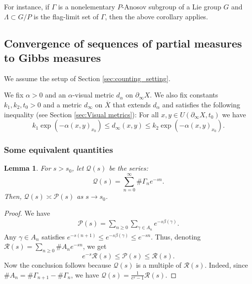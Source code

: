 \documentclass[12pt]{amsbook}%
\newtheorem{lem}[thm]{Lemma}
\theoremstyle{definition}
\theoremstyle{remark}
\numberwithin{section}{chapter}
\numberwithin{subsection}{section}
\numberwithin{figure}{chapter}
\def\dyl{>0}
\def\cP{{\mathscr{P}}}
\def\cQ{{\mathscr{Q}}}
\def\cR{{\mathscr{R}}}
\def\Ga{\Gamma}
\def\La{\Lambda}
\def\geo{\partial_\infty}
\def\ol{\overline}
\def\kap{}
\begin{document}
{{ For instance, if $\Ga$ is a nonelementary $P$-Anosov subgroup of a Lie group $G$ and $\La\subset G/P$ is the flag-limit set of $\Ga$, then the above corollary applies. 
 
 

\subsection{Convergence of sequences of partial measures to Gibbs measures} \label{sec:partial measures}


We assume the setup of Section \ref{sec:counting_setting}.


We fix $\alpha\dyl$ and an $\alpha$-visual metric $d_\alpha$ on $\geo X$. We also fix constants $k_1,k_2,t_0\dyl$ and a metric $d_\infty$ on $\ol{X}$ that extends $d_\alpha$ and satisfies the following inequality (see Section \ref{sec:Visual metrics}): For all $x,y\in U(\geo X,t_0)$ we have 
\begin{equation}\label{eq:dinfty_gromovproduct_bounded}
k_1\exp(-\alpha (x,y)_{x_0})\leqslant d_\infty(x,y)\leqslant k_2\exp(-\alpha (x,y)_{x_0}).
\end{equation}


\subsubsection{Some equivalent quantities}
\begin{lem}\label{lem:equivalent_poincare_series}
For $s>s_0$, let $\cQ(s)$ be the series:
\[
\cQ(s)=\sum_{n=0}^\infty \#\Gamma_n e^{-sn}.
\]
Then, $\cQ(s) \asymp \cP(s)$ 
as $s\rightarrow s_0$.

\end{lem}
\begin{proof}
We have
\begin{align*}
\cP(s)=\sum_{n\geqslant 0}\sum_{\gamma \in A_n}e^{-s\beta(\gamma)}.
\end{align*}
Any $\gamma \in A_n$ satisfies $e^{-s(n+1)}\leqslant e^{-s\beta(\gamma)}\leqslant e^{-sn}$. Thus, denoting $\cR(s)=\sum_{n\geqslant 0}\# A_n e^{-sn}$, we get 
\[
e^{-s}\cR(s)\leqslant \cP(s) \leqslant \cR(s).
\]
Now the conclusion follows because $\cQ(s)$ is a multiple of $\cR(s)$. Indeed, since $\#A_n=\#\Gamma_{n+1}-\#\Gamma_n$, we have $\cQ(s)=\frac{1}{e^s-1}\cR(s)$. 
\end{proof}

}}
\end{document}
